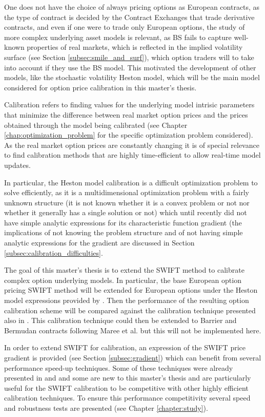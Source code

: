 \documentclass[12,twoside]{mammeTFM}
\theoremstyle{definition}
\theoremstyle{remark}
\begin{document}
One does not have the choice of always pricing options as European contracts, as the type of contract is decided by the Contract Exchanges that trade derivative contracts, and even if one were to trade only European options, the study of more complex underlying asset models is relevant, as BS fails to capture well-known properties of real markets, which is reflected in the implied volatility surface (see Section \ref{subsec:smile_and_surf}), which option traders will to take into account if they use the BS model. This motivated the development of other models, like the stochastic volatility Heston model, which will be the main model considered for option price calibration in this master's thesis.

Calibration refers to finding values for the underlying model intrisic parameters that minimize the difference between real market option prices and the prices obtained through the model being calibrated (see Chapter \ref{chap:optimization_problem} for the specific optimization problem considered). As the real market option prices are constantly changing it is of special relevance to find calibration methods that are highly time-efficient to allow real-time model updates.

In particular, the Heston model calibration is a difficult optimization problem to solve efficiently, as it is a multidimensional optimization problem with a fairly unknown structure (it is not known whether it is a convex problem or not nor whether it generally has a single solution or not) which until recently did not have simple analytic expressions for its characteristic function gradient \cite{cui17} (the implications of not knowing the problem structure and of not having simple analytic expressions for the gradient are discussed in Section \ref{subsec:calibration_difficulties}.

The goal of this master's thesis is to extend the SWIFT method to calibrate complex option underlying models. In particular, the base European option pricing SWIFT method will be extended for European options under the Heston model expressions provided by \cite{cui17}. Then the performance of the resulting option calibration scheme will be compared against the calibration technique presented also in \cite{cui17}. This calibration technique could then be extended to Barrier and Bermudan contracts following Maree et al. \cite{mar17} but this will not be implemented here.

In order to extend SWIFT for calibration, an expression of the SWIFT price gradient is provided (see Section \ref{subsec:gradient}) which can benefit from several performance speed-up techniques. Some of these techniques were already presented in \cite{Ortiz-Gracia2016} and \cite{mar17} and some are new to this master's thesis and are particularly useful for the SWIFT calibration to be competitive with other highly efficient calibration techniques. To ensure this performance competitivity several speed and robustness tests are presented (see Chapter \ref{chapter:study}).
\end{document}
